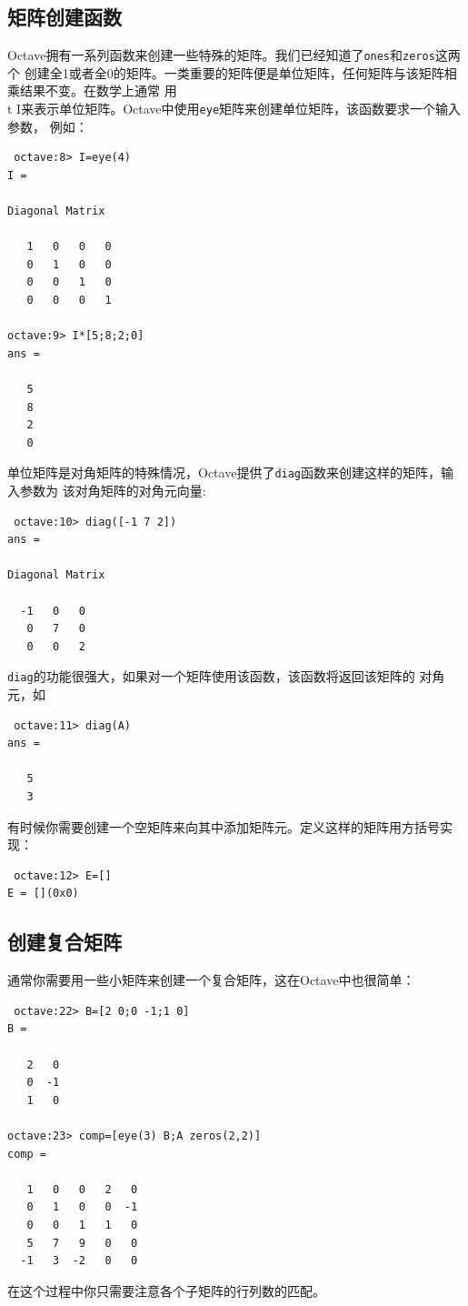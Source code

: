 \documentclass[UTF8,adobefonts]{ctexart}
\begin{document}
\subsection{矩阵创建函数}
Octave拥有一系列函数来创建一些特殊的矩阵。我们已经知道了{\tt ones}和{\tt zeros}这两个
创建全1或者全0的矩阵。一类重要的矩阵便是单位矩阵，任何矩阵与该矩阵相乘结果不变。在数学上通常
用{\\t I}来表示单位矩阵。Octave中使用{\tt eye}矩阵来创建单位矩阵，该函数要求一个输入参数，
例如：
\begin{verbatim}
 octave:8> I=eye(4)
I =

Diagonal Matrix

   1   0   0   0
   0   1   0   0
   0   0   1   0
   0   0   0   1

octave:9> I*[5;8;2;0]
ans =

   5
   8
   2
   0
\end{verbatim}
单位矩阵是对角矩阵的特殊情况，Octave提供了{\tt diag}函数来创建这样的矩阵，输入参数为
该对角矩阵的对角元向量:
\begin{verbatim}
 octave:10> diag([-1 7 2])
ans =

Diagonal Matrix

  -1   0   0
   0   7   0
   0   0   2
\end{verbatim}
{\tt diag}的功能很强大，如果对一个矩阵使用该函数，该函数将返回该矩阵的
对角元，如
\begin{verbatim}
 octave:11> diag(A)
ans =

   5
   3
\end{verbatim}
有时候你需要创建一个空矩阵来向其中添加矩阵元。定义这样的矩阵用方括号实现：
\begin{verbatim}
 octave:12> E=[]
E = [](0x0)
\end{verbatim}
\subsection{创建复合矩阵}
通常你需要用一些小矩阵来创建一个复合矩阵，这在Octave中也很简单：
\begin{verbatim}
 octave:22> B=[2 0;0 -1;1 0]
B =

   2   0
   0  -1
   1   0

octave:23> comp=[eye(3) B;A zeros(2,2)]
comp =

   1   0   0   2   0
   0   1   0   0  -1
   0   0   1   1   0
   5   7   9   0   0
  -1   3  -2   0   0
\end{verbatim}
在这个过程中你只需要注意各个子矩阵的行列数的匹配。
\end{document}
